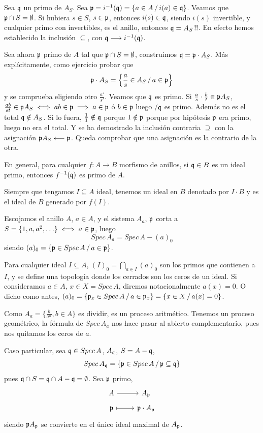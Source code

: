 \begin{dem}
    Sea $\mathfrak{q}$ un primo de $A_S$. Sea $\mathfrak{p} = i^{-1} (\mathfrak{q}) = \{ a\in A \, / \, i(a) \in \mathfrak{q}\}$. Veamos que $\mathfrak{p} \cap S = \emptyset$. Si hubiera $s\in S$, $s\in \mathfrak{p}$, entonces $i(s) \in \mathfrak{q}$, siendo $i(s)$ invertible, y cualquier primo con invertibles, es el anillo, entonces $\mathfrak{q} = A_S \, !!$. En efecto hemos establecido la inclusi\'on $\subseteq$, con $\mathfrak{q} \longrightarrow i^{-1}(\mathfrak{q})$.

    Sea ahora $\mathfrak{p}$ primo de $A$ tal que $\mathfrak{p} \cap S = \emptyset$, construimos $\mathfrak{q} = \mathfrak{p} \cdot A_S$.  M\'as expl\'icitamente, como ejercicio probar que $$\mathfrak{p} \cdot A_S = \left\{\frac{a}{s} \in A_S \,  / \, a \in \mathfrak{p}\right\}$$
    y se comprueba eligiendo otro $\frac{a'}{s'}$. Veamos que $\mathfrak{q}$ es primo. Si $\frac{a}{s}\cdot \frac{b}{t} \in \mathfrak{p} A_S$, $\frac{ab}{st} \in \mathfrak{p} A_S \iff ab \in \mathfrak{p} \implies a\in \mathfrak{p}$ \'o $b \in \mathfrak{p}$ luego /$\mathfrak{q}$ es primo. Adem\'as no es el total $\mathfrak{q} \notin A_S$. Si lo fuera, $\frac{1}{1} \notin \mathfrak{q}$ porque $1 \notin \mathfrak{p}$ porque por hip\'otesis $\mathfrak{p}$ era primo, luego no era el total. Y se ha demostrado la inclusi\'on contraria $\supseteq$ con la asignaci\'on $\mathfrak{p} A_S \longleftarrow \mathfrak{p}$. Queda comprobar que una asignaci\'on es la contrario de la otra.
\end{dem}
\begin{obs}
    En general, para cualquier $f : A \longrightarrow B$ morfismo de anillos, si $\mathfrak{q} \in B$ es un ideal primo, entonces $f^{-1}(\mathfrak{q})$ es primo de $A$. 

    Siempre que tengamos $I \subseteq A$ ideal, tenemos un ideal en $B$ denotado por $I \cdot B$ y es el ideal de $B$ generado por $f(I)$.
\end{obs}
\begin{ejems}
    Escojamos el anillo $A$, $a\in A$, y el sistema $A_a$, $\mathfrak{p}$ corta a $S = \{1, a , a^2, \ldots\} \iff a \in \mathfrak{p}$, luego 
    $$Spec\, A_a = Spec \, A -(a)_0 $$
    siendo $(a)_0 = \{\mathfrak{p} \in Spec \, A \, / \, a \in \mathfrak{p} \}$. 

Para cualquier ideal $I \subseteq A$, $\displaystyle (I)_0 = \bigcap_{a\in I} (a)_0$ son los primos que contienen a $I$, y se define una topolog\'ia donde los cerrados son los ceros de un ideal. Si consideramos $a \in A$, $x\in X = Spec \, A$, diremos notacionalmente $a(x)=0$. O dicho como antes, $(a)_0 = \{\mathfrak{p}_x \in Spec \, A \, / \, a \in \mathfrak{p}_x \} = \{ x\in X \, /\, a(x)=0\}$. 

Como $A_a=\{ \frac{b}{a^n}, b\in A\}$ es dividir, es un proceso aritm\'etico. Tenemos un proceso geom\'etrico, la f\'ormula de $Spec\, A_a$ nos hace pasar al abierto complementario, pues nos quitamos los ceros de $a$. 

Caso particular, sea $\mathfrak{q} \in Spec \, A$, $A_{\mathfrak{q}}$, $S=A-\mathfrak{q}$, 
$$Spec\, A_{\mathfrak{q}} = \{ \mathfrak{p} \in Spec\, A \, / \, \mathfrak{p} \subseteq \mathfrak{q} \}$$
pues $\mathfrak{q}\cap S = \mathfrak{q} \cap A-\mathfrak{q} = \emptyset$. Sea $\mathfrak{p}$ primo,
$$\bt A \arrow{r}& A_\p \\[-5mm] \p \arrow[mapsto]{r} & \p \cdot A_\p \et$$
siendo $\mathfrak{p} A_{\mathfrak{p}}$ se convierte en el \'unico ideal maximal de $A_{\mathfrak{p}}$. 
\end{ejems}

